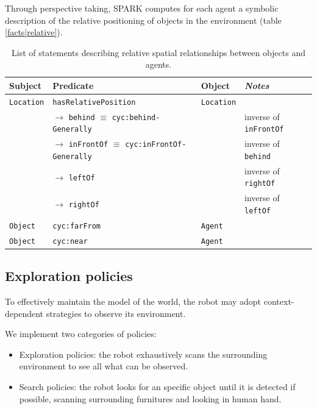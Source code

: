 \documentclass{svmult}
\newcommand{\concept}[1]{{\footnotesize \texttt{#1}}}
\begin{document}
Through perspective taking, SPARK computes for each agent a symbolic
description of the relative positioning of objects in the environment (table
\ref{facts|relative}).

\begin{table}[h]
	\centering
	    \begin{tabular}{p{1.5cm}p{6cm}p{1.5cm}l}
		\rowcolor{white}
		\textbf{Subject} & \textbf{Predicate} & \textbf{Object} & \emph{Notes} \\
		\hline
	 \concept{Location}  & \concept{hasRelativePosition}  & \concept{Location} & \\ 
	 & 	$\rightarrow$ \concept{behind} $\equiv$ \concept{cyc:behind-Generally}  &  & inverse of \concept{inFrontOf}  \\ 
	 &  $\rightarrow$ \concept{inFrontOf} $\equiv$ \concept{cyc:inFrontOf-Generally}  & 	 & 	 inverse of \concept{behind}  \\ 
	 &  $\rightarrow$ \concept{leftOf}  &  &  inverse of \concept{rightOf} \\ 
	 &  $\rightarrow$ \concept{rightOf}  & 	 & 	 inverse of \concept{leftOf}  \\ 
	 \concept{Object}  & \concept{cyc:farFrom}  &  \concept{Agent} & \\ 
	 \concept{Object}  & \concept{cyc:near}  &  \concept{Agent} & 
	\end{tabular}
	\caption{List of statements describing relative spatial relationships between objects and agents.}
	\label{table|relative}
\end{table}


\subsection{Exploration policies}

To effectively maintain the model of the world, the robot may adopt context-dependent strategies to observe its environment.

We implement two categories of policies:

\begin {itemize}
\item Exploration policies: the robot exhaustively scans the surrounding environment to
  see all what can be observed.

\item Search policies: the robot looks for an specific object until it is
  detected if possible, scanning surrounding furnitures and looking in human
  hand.

\end {itemize}
\end{document}
